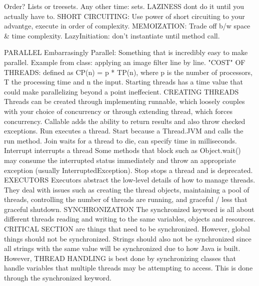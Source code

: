 \documentclass[10pt]{article}
\begin{document}
\begin{landscape}
\begin{multicols*}{6}
Order? Lists or treesets. Any other time: sets. LAZINESS dont do it until you actually have to. SHORT CIRCUITING: Use power of short circuiting to your advantge, execute in order of complexity. MEMOIZATION: Trade off b/w space \& time complexity. LazyInitiation: don't instantiate until method call.

PARALLEL
Embarrasingly Parallel: Something that is incredibly easy to make parallel. Example from class: applying an image filter line by line. "COST" OF THREADS: defined as CP(n) = p * TP(n), where p is the number of processors, T the processing time and n the input. Starting threads has a time value that could make parallelizing beyond a point ineffecient. CREATING THREADS Threads can be created through implementing runnable, which loosely couples with your choice of concurrency or through extending thread, which forces concurrency. Callable adds the ability to return results and also throw checked exceptions. Run executes a thread. Start because a Thread.JVM and calls the run method. Join waits for a thread to die, can specify time in milliseconds. Interrupt interrupts a thread Some methods that block such as Object.wait() may consume the interrupted status immediately and throw an appropriate exception (usually InterruptedException). Stop stops a thread and is deprecated. EXECUTORS Executors abstract the low-level details of how to manage threads. They deal with issues such as creating the thread objects, maintaining a pool of threads, controlling the number of threads are running, and graceful / less that graceful shutdown. SYNCHRONIZATION The synchronized keyword is all about different threads reading and writing to the same variables, objects and resources. CRITICAL SECTION are things that need to be synchronized. However, global things should not be synchronized. Strings should also not be synchronized since all strings with the same value will be synchronized due to how Java is built. However, THREAD HANDLING is best done by synchronizing classes that handle variables that multiple threads may be attempting to access. This is done through the synchronized keyword.

\end{multicols*}
\end{landscape}
\end{document}
